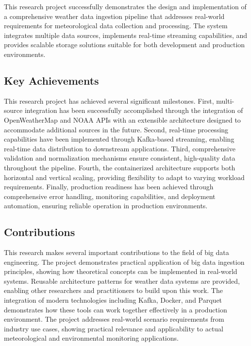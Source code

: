 \documentclass[12pt,a4paper]{article}
\begin{document}
This research project successfully demonstrates the design and implementation of a comprehensive weather data ingestion pipeline that addresses real-world requirements for meteorological data collection and processing. The system integrates multiple data sources, implements real-time streaming capabilities, and provides scalable storage solutions suitable for both development and production environments.

\subsection{Key Achievements}

This research project has achieved several significant milestones. First, multi-source integration has been successfully accomplished through the integration of OpenWeatherMap and NOAA APIs with an extensible architecture designed to accommodate additional sources in the future. Second, real-time processing capabilities have been implemented through Kafka-based streaming, enabling real-time data distribution to downstream applications. Third, comprehensive validation and normalization mechanisms ensure consistent, high-quality data throughout the pipeline. Fourth, the containerized architecture supports both horizontal and vertical scaling, providing flexibility to adapt to varying workload requirements. Finally, production readiness has been achieved through comprehensive error handling, monitoring capabilities, and deployment automation, ensuring reliable operation in production environments.

\subsection{Contributions}

This research makes several important contributions to the field of big data engineering. The project demonstrates practical application of big data ingestion principles, showing how theoretical concepts can be implemented in real-world systems. Reusable architecture patterns for weather data systems are provided, enabling other researchers and practitioners to build upon this work. The integration of modern technologies including Kafka, Docker, and Parquet demonstrates how these tools can work together effectively in a production environment. The project addresses real-world scenario requirements from industry use cases, showing practical relevance and applicability to actual meteorological and environmental monitoring applications.
\end{document}
